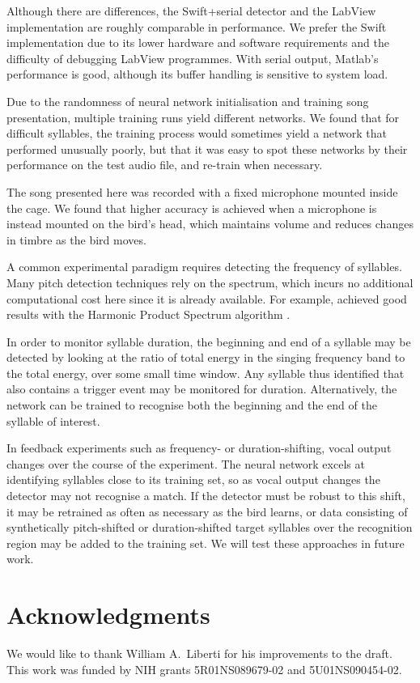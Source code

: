 \documentclass[10pt,letterpaper]{article}
\begin{document}
Although there are differences, the Swift+serial detector and the LabView implementation are roughly comparable in performance.  We prefer the Swift implementation due to its lower hardware and software requirements and the difficulty of debugging LabView programmes.  With serial output, Matlab's performance is good, although its buffer handling is sensitive to system load.

Due to the randomness of neural network initialisation and training song presentation, multiple training runs yield different networks.  We found that for difficult syllables, the training process would sometimes yield a network that performed unusually poorly, but that it was easy to spot these networks by their performance on the test audio file, and re-train when necessary.

The song presented here was recorded with a fixed microphone mounted inside the cage.  We found that higher accuracy is achieved when a microphone is instead mounted on the bird's head, which maintains volume and reduces changes in timbre as the bird moves.

A common experimental paradigm requires detecting the frequency of syllables.  Many pitch detection techniques rely on the spectrum, which incurs no additional computational cost here since it is already available.  For example, \cite{Canopoli2014} achieved good results with the Harmonic Product Spectrum algorithm \cite{Noll1970}.

In order to monitor syllable duration, the beginning and end of a syllable may be detected by looking at the ratio of total energy in the singing frequency band to the total energy, over some small time window.  Any syllable thus identified that also contains a trigger event may be monitored for duration.  Alternatively, the network can be trained to recognise both the beginning and the end of the syllable of interest.

In feedback experiments such as frequency- or duration-shifting, vocal output changes over the course of the experiment.  The neural network excels at identifying syllables close to its training set, so as vocal output changes the detector may not recognise a match.  If the detector must be robust to this shift, it may be retrained as often as necessary as the bird learns, or data consisting of synthetically pitch-shifted or duration-shifted target syllables over the recognition region may be added to the training set.  We will test these approaches in future work.

\section{Acknowledgments}
We would like to thank William A.~Liberti for his improvements to the draft.
This work was funded by NIH grants 5R01NS089679-02 and 5U01NS090454-02.
\end{document}
